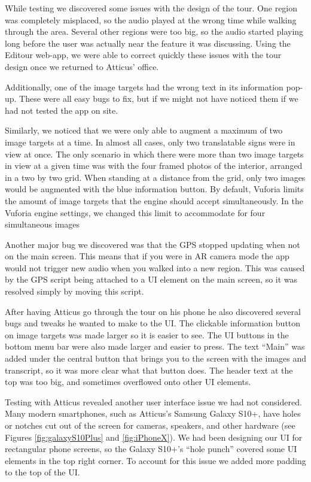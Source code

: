 \documentclass[a4paper, 10pt, american, titlepage]{article}
\begin{document}
While testing we discovered some issues with the design of the tour. One
region was completely misplaced, so the audio played at the wrong time while
walking through the area. Several other regions were too big, so the audio
started playing long before the user was actually near the feature it was
discussing. Using the Editour web-app, we were able to correct quickly these
issues with the tour design once we returned to Atticus' office.

Additionally, one of the image targets had the wrong text in its information
pop-up. These were all easy bugs to fix, but if we might not have noticed
them if we had not tested the app on site.

Similarly, we noticed that we were only able to augment a maximum of two
image targets at a time. In almost all cases, only two translatable signs
were in view at once. The only scenario in which there were more than two
image targets in view at a given time was with the four framed photos of the
interior, arranged in a two by two grid. When standing at a distance from the
grid, only two images would be augmented with the blue information button. By
default, Vuforia limits the amount of image targets that the engine should
accept simultaneously. In the Vuforia engine settings, we changed this limit
to accommodate for four simultaneous images

Another major bug we discovered was that the GPS stopped updating when not on
the main screen. This means that if you were in AR camera mode the app would not
trigger new audio when you walked into a new region. This was caused by the GPS
script being attached to a UI element on the main screen, so it was resolved
simply by moving this script.

After having Atticus go through the tour on his phone he also discovered several
bugs and tweaks he wanted to make to the UI. The clickable information button on
image targets was made larger so it is easier to see. The UI buttons in the
bottom menu bar were also made larger and easier to press. The text ``Main'' was
added under the central button that brings you to the screen with the images and
transcript, so it was more clear what that button does. The header text at the
top was too big, and sometimes overflowed onto other UI elements.

Testing with Atticus revealed another user interface issue we had not
considered.  Many modern smartphones, such as Atticus's Samsung Galaxy S10+,
have holes or notches cut out of the screen for cameras, speakers, and other
hardware (see Figures \ref{fig:galaxyS10Plus} and \ref{fig:iPhoneX}). We had
been designing our UI for rectangular phone screens, so the Galaxy S10+'s ``hole
punch'' covered some UI elements in the top right corner. To account for this
issue we added more padding to the top of the UI.
\end{document}
